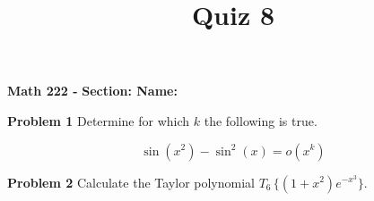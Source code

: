 \documentclass{article}
\title{Quiz 8}
\begin{document}
\begin{center}\makeatletter %
{ \bf Math 222 - \@title }
{ \bf \hfill Section: \underline{\hspace{2cm}} \hfill Name: \underline{\hspace{5cm}} }
\end{center}

{\bf Problem 1} \quad Determine for which $k$ the following is true.

\[ \sin\left(x^2\right) - \sin^2(x) = o(x^k) \]\vfill

{\bf Problem 2} Calculate the Taylor polynomial $T_6\,\Big\{(1 + x^2)e^{-x^3}\Big\}$.\vfill
\end{document}
